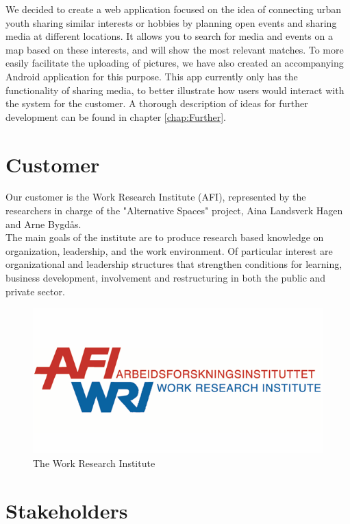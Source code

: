 We decided to create a web application focused on the idea of connecting urban youth sharing similar interests or hobbies by planning open events and sharing media at different locations. It allows you to search for media and events on a map based on these interests, and will show the most relevant matches. To more easily facilitate the uploading of pictures, we have also created an accompanying Android application for this purpose. This app currently only has the functionality of sharing media, to better illustrate how users would interact with the system for the customer. A thorough description of ideas for further development can be found in chapter \ref{chap:Further}.


\section{Customer}
\label{sec:IntroCustomer}

Our customer is the Work Research Institute (AFI), represented by the researchers in charge of the "Alternative Spaces" project, Aina Landsverk Hagen and Arne Bygd\aa s. \\
The main goals of the institute are to produce research based knowledge on organization, leadership, and the work environment. Of particular interest are organizational and leadership structures that strengthen conditions for learning, business development, involvement and restructuring in both the public and private sector.

\begin{figure}[ht!]
\centering
\includegraphics[width=\linewidth]{./Introduction/img/afi}
\caption{The Work Research Institute \label{fig:IntroAfi}}
\end{figure}

\section{Stakeholders}
\label{sec:IntroStakeholders}

